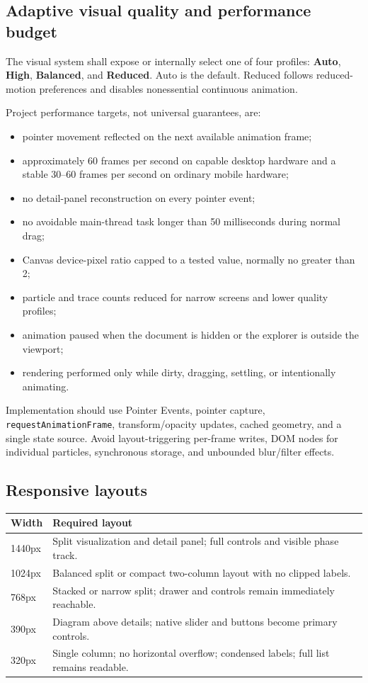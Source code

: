 \documentclass[11pt,letterpaper]{article}
\newcommand{\term}[1]{\textbf{\textsf{#1}}}
\begin{document}
\subsection{Adaptive visual quality and performance budget}
The visual system shall expose or internally select one of four profiles: \term{Auto}, \term{High}, \term{Balanced}, and \term{Reduced}. Auto is the default. Reduced follows reduced-motion preferences and disables nonessential continuous animation.

Project performance targets, not universal guarantees, are:
\begin{itemize}
\item pointer movement reflected on the next available animation frame;
\item approximately 60 frames per second on capable desktop hardware and a stable 30--60 frames per second on ordinary mobile hardware;
\item no detail-panel reconstruction on every pointer event;
\item no avoidable main-thread task longer than 50 milliseconds during normal drag;
\item Canvas device-pixel ratio capped to a tested value, normally no greater than 2;
\item particle and trace counts reduced for narrow screens and lower quality profiles;
\item animation paused when the document is hidden or the explorer is outside the viewport;
\item rendering performed only while dirty, dragging, settling, or intentionally animating.
\end{itemize}

Implementation should use Pointer Events, pointer capture, \texttt{requestAnimationFrame}, transform/opacity updates, cached geometry, and a single state source. Avoid layout-triggering per-frame writes, DOM nodes for individual particles, synchronous storage, and unbounded blur/filter effects.

\subsection{Responsive layouts}
\begin{tabularx}{\textwidth}{L{1.0in}Y}
\toprule
\textbf{Width} & \textbf{Required layout} \\
\midrule
1440px & Split visualization and detail panel; full controls and visible phase track. \\
1024px & Balanced split or compact two-column layout with no clipped labels. \\
768px & Stacked or narrow split; drawer and controls remain immediately reachable. \\
390px & Diagram above details; native slider and buttons become primary controls. \\
320px & Single column; no horizontal overflow; condensed labels; full list remains readable. \\
\bottomrule
\end{tabularx}
\end{document}
